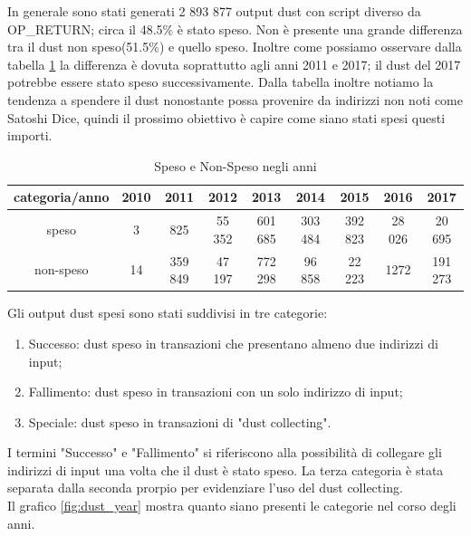 In generale sono stati generati 2 893 877 output dust con script diverso da OP\_RETURN; circa il 48.5\% è stato speso. Non è presente una grande differenza tra il dust non speso(51.5\%) e quello speso. Inoltre come possiamo osservare dalla tabella \ref{tab:dust_spent_unspent} la differenza è dovuta soprattutto agli anni 2011 e 2017; il dust del 2017 potrebbe essere stato speso successivamente. Dalla tabella inoltre notiamo la tendenza a spendere il dust nonostante possa provenire da indirizzi non noti come Satoshi Dice, quindi il prossimo obiettivo è capire come siano stati spesi questi importi.
\begin{table}[H]
    \centering
    \begin{tabular}{|c|c|c|c|c|c|c|c|c|}
        \hline
           categoria/anno   & 2010 & 2011 & 2012 & 2013 & 2014 & 2015 & 2016 & 2017\\
        \hline 
         speso &  3 & 825 & 55 352 & 601 685 & 303 484 & 392 823 & 28 026 & 20 695 \\
         \hline
         non-speso & 14 & 359 849 & 47 197 & 772 298 & 96 858 & 22 223 & 1272 & 191 273  \\
         \hline
    \end{tabular}
    \caption{Speso e Non-Speso negli anni}
    \label{tab:dust_spent_unspent}
\end{table}
Gli output dust spesi sono stati suddivisi in tre categorie:
\begin{enumerate}
    \item Successo: dust speso in transazioni che presentano almeno due indirizzi di input;
    \item Fallimento: dust speso in transazioni con un solo indirizzo di input;
    \item Speciale: dust speso in transazioni di "dust collecting".
\end{enumerate}
I termini "Successo" e "Fallimento" si riferiscono alla possibilità di collegare gli indirizzi di input una volta che il dust è stato speso. La terza categoria è stata separata dalla seconda prorpio per evidenziare l'uso del dust collecting.\\
Il grafico \ref{fig:dust_year} mostra quanto siano presenti le categorie nel corso degli anni.
